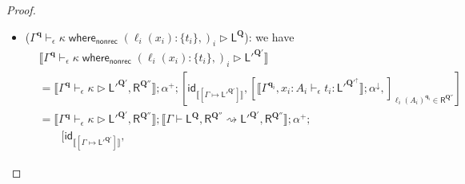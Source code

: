 \documentclass[acmsmall,screen,anonymous,review]{acmart}
\newcommand{\mb}[1]{\ensuremath{\mathbf{#1}}}
\newcommand{\ms}[1]{\ensuremath{\mathsf{#1}}}
\newcommand{\lto}{:}
\newcommand{\linl}[1]{\iota_l\;{#1}}
\newcommand{\linr}[1]{\iota_r\;{#1}}
\newcommand{\casestmt}[5]{\ms{case}\;#1\;\{\linl{#2} \lto #3, \linr{#4} \lto #5\}}
\newcommand{\awhere}[2]{#1\;\ms{where}_{\ms{nonrec}}\;#2}
\newcommand{\wbranch}[3]{#1(#2) \lto \{#3\}}
\newcommand{\qsp}[4]{#1 \vdash #2 = #3 + #4}
\newcommand{\lwk}[3]{#1 \vdash #2 \rightsquigarrow #3}
\newcommand{\hasty}[4]{#1 \vdash_{#2} #3: {#4}}
\newcommand{\haslb}[4]{#1 \vdash_{#2} #3 \rhd #4}
\newcommand{\ltoty}[2]{[#1 \mapsto #2]}
\newcommand{\dnt}[1]{\llbracket{#1}\rrbracket}
\newcommand{\zeroqv}[1]{#1^\uparrow}
\begin{document}
\begin{proof}
\begin{itemize}
\begin{align*}
      ; [ \\ & \qquad
      \dnt{\hasty{\Gamma^{\mb{q}_l}, x : A}{\epsilon}{\tau_l}{\ms{L}^{\zeroqv{\mb{Q}}}}}
        ; \dnt{\lwk{\Gamma, x : A}{\ms{L}^{\zeroqv{\mb{Q}}}}{{\ms{L}'^{\zeroqv{\mb{Q}'}}}}}
        ; \alpha^\downarrow, \\ & \qquad
      \dnt{\hasty{\Gamma^{\mb{q}_l}, y : B}{\epsilon}{\tau_r}{\ms{L}^{\zeroqv{\mb{Q}}}}}
        ; \dnt{\lwk{\Gamma, y : B}{\ms{L}^{\zeroqv{\mb{Q}}}}{{\ms{L}'^{\zeroqv{\mb{Q}'}}}}}
        ; \alpha^\downarrow
    ]\\
    &= \dnt{\qsp{\Gamma}{\mb{q}}{\mb{q}_l}{\mb{q}_r}} 
      ; \dnt{\Gamma^{\mb{q}_l}} \otimes \dnt{\hasty{\Gamma^{\mb{q}_r}}{\epsilon}{o}{A + B}}
      ; [ \\ & \qquad
      \dnt{\hasty{\Gamma^{\mb{q}_l}, x : A}{\epsilon}{\tau_l}{\ms{L}^{\zeroqv{\mb{Q}}}}}
        ; \alpha^\downarrow
        ; \dnt{\lwk{\Gamma}{\ms{L}^{\zeroqv{\mb{Q}}}}{{\ms{L}^{\zeroqv{\mb{Q}'}}}}}, 
      \dnt{\hasty{\Gamma^{\mb{q}_l}, y : B}{\epsilon}{\tau_r}{\ms{L}^{\zeroqv{\mb{Q}}}}}
        ; \alpha^\downarrow
        ; \dnt{\lwk{\Gamma}{\ms{L}^{\mb{Q}}}{{\ms{L}'^{\mb{Q}'}}}}
    ] \\
    &= \dnt{
      \haslb{\Gamma^{\mb{q}}}{\epsilon}{\casestmt{o}{x}{\tau_l}{y}{\tau_r}}{\ms{L}^{\mb{Q}}}
    } ; \dnt{\lwk{\Gamma}{\ms{L}^{\mb{Q}}}{{\ms{L}'^{\mb{Q}'}}}}
    \end{align*}
    \item ($\haslb{\Gamma^{\mb{q}}}{\epsilon}{\awhere{\kappa}{(\wbranch{\ell_i}{x_i}{t_i},)_i}}
      {\ms{L}^{\mb{Q}}}$): we have
    \begin{align*}
    &\dnt{\haslb{\Gamma^{\mb{q}}}{\epsilon}{\awhere{\kappa}{(\wbranch{\ell_i}{x_i}{t_i},)_i}}
      {\ms{L}'^{\mb{Q}'}}} \\
    & = \dnt{\haslb{\Gamma^{\mb{q}}}{\epsilon}{\kappa}{\ms{L}'^{\mb{Q}'}, \ms{R}^{\mb{Q}''}}} 
      ; \alpha^+
      ; [
        \ms{id}_{\dnt{\ltoty{\Gamma}{\ms{L}'^{\mb{Q}'}}}},
        [
          \dnt{\hasty{\Gamma^{\mb{q}_i}, x_i : A_i}{\epsilon}{t_i}
            {\ms{L}'^{\zeroqv{\mb{Q}'}}}} ; \alpha^\downarrow,
        ]_{\ell_i(A_i)^{\mb{q}_i} \in \ms{R}^{\mb{Q}''}}
      ] \\
    & = \dnt{\haslb{\Gamma^{\mb{q}}}{\epsilon}{\kappa}{\ms{L}'^{\mb{Q}'}, \ms{R}^{\mb{Q}''}}}
      ; \dnt{\lwk{\Gamma}{\ms{L}^{\mb{Q}}, \ms{R}^{\mb{Q}''}}{\ms{L}'^{\mb{Q}'}, \ms{R}^{\mb{Q}''}}}
      ; \alpha^+
      ; \\ &\qquad [
        \ms{id}_{\dnt{\ltoty{\Gamma}{\ms{L}'^{\mb{Q}'}}}},

\end{align*}
\end{itemize}
\end{proof}
\end{document}
